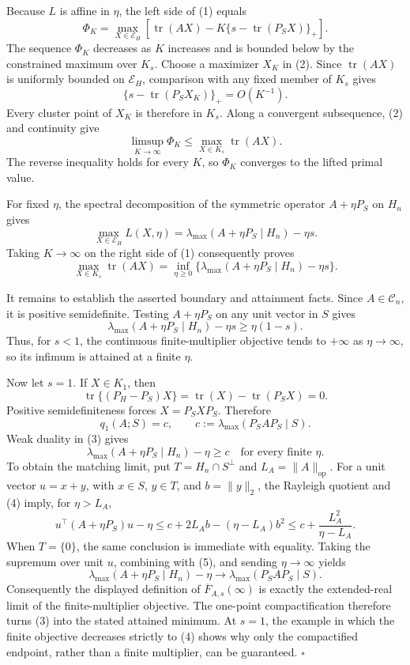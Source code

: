 Because \(L\) is affine in \(\eta\), the left side of (1) equals
\[
\Phi_K
=\max_{X\in\mathcal E_H}
\left[\operatorname{tr}(AX)-K\{s-\operatorname{tr}(P_SX)\}_+\right].
\tag{2}
\]
The sequence \(\Phi_K\) decreases as \(K\) increases and is bounded below by the constrained maximum over \(K_s\). Choose a maximizer \(X_K\) in (2). Since \(\operatorname{tr}(AX)\) is uniformly bounded on \(\mathcal E_H\), comparison with any fixed member of \(K_s\) gives
\[
\{s-\operatorname{tr}(P_SX_K)\}_+=O(K^{-1}).
\]
Every cluster point of \(X_K\) is therefore in \(K_s\). Along a convergent subsequence, (2) and continuity give
\[
\limsup_{K\to\infty}\Phi_K
\leq\max_{X\in K_s}\operatorname{tr}(AX).
\]
The reverse inequality holds for every \(K\), so \(\Phi_K\) converges to the lifted primal value.

For fixed \(\eta\), the spectral decomposition of the symmetric operator \(A+\eta P_S\) on \(H_n\) gives
\[
\max_{X\in\mathcal E_H}L(X,\eta)
=\lambda_{\max}(A+\eta P_S\mid H_n)-\eta s.
\]
Taking \(K\to\infty\) on the right side of (1) consequently proves
\[
\max_{X\in K_s}\operatorname{tr}(AX)
=\inf_{\eta\geq0}
\{\lambda_{\max}(A+\eta P_S\mid H_n)-\eta s\}.
\tag{3}
\]

It remains to establish the asserted boundary and attainment facts. Since \(A\in\mathcal C_n\), it is positive semidefinite. Testing \(A+\eta P_S\) on any unit vector in \(S\) gives
\[
\lambda_{\max}(A+\eta P_S\mid H_n)-\eta s
\geq\eta(1-s).
\]
Thus, for \(s<1\), the continuous finite-multiplier objective tends to \(+\infty\) as \(\eta\to\infty\), so its infimum is attained at a finite \(\eta\).

Now let \(s=1\). If \(X\in K_1\), then
\[
\operatorname{tr}\{(P_H-P_S)X\}
=\operatorname{tr}(X)-\operatorname{tr}(P_SX)=0.
\]
Positive semidefiniteness forces \(X=P_SXP_S\). Therefore
\[
q_1(A;S)=c,
\qquad
c:=\lambda_{\max}(P_SAP_S\mid S).
\tag{4}
\]
Weak duality in (3) gives
\[
\lambda_{\max}(A+\eta P_S\mid H_n)-\eta\geq c
\quad\text{for every finite }\eta.
\tag{5}
\]
To obtain the matching limit, put \(T=H_n\cap S^\perp\) and \(L_A=\|A\|_{\mathrm{op}}\). For a unit vector \(u=x+y\), with \(x\in S\), \(y\in T\), and \(b=\|y\|_2\), the Rayleigh quotient and (4) imply, for \(\eta>L_A\),
\[
u^\top(A+\eta P_S)u-\eta
\leq c+2L_Ab-(\eta-L_A)b^2
\leq c+\frac{L_A^2}{\eta-L_A}.
\]
When \(T=\{0\}\), the same conclusion is immediate with equality. Taking the supremum over unit \(u\), combining with (5), and sending \(\eta\to\infty\) yields
\[
\lambda_{\max}(A+\eta P_S\mid H_n)-\eta
\longrightarrow\lambda_{\max}(P_SAP_S\mid S).
\]
Consequently the displayed definition of \(\overline F_{A,s}(\infty)\) is exactly the extended-real limit of the finite-multiplier objective. The one-point compactification therefore turns (3) into the stated attained minimum. At \(s=1\), the example in which the finite objective decreases strictly to (4) shows why only the compactified endpoint, rather than a finite multiplier, can be guaranteed. \(\square\)